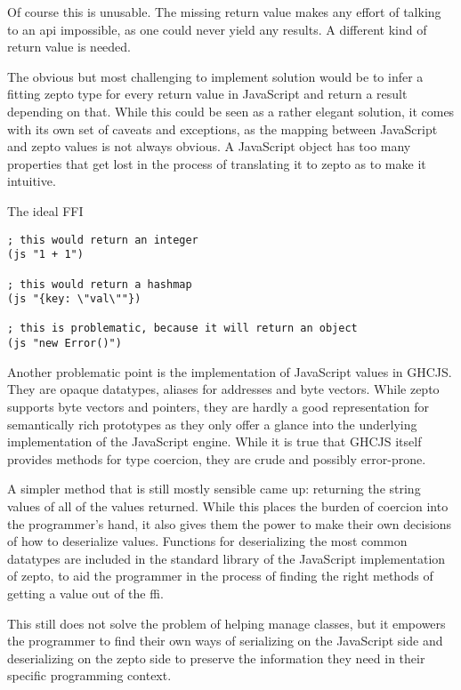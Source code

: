 \documentclass[oneside,11pt,xetex]{scrbook}
\begin{document}
Of course this is unusable. The missing return value makes any effort of talking to an
\gls{api} impossible, as one could never yield any results. A different kind of return
value is needed.

The obvious but most challenging to implement solution would be to infer a fitting zepto
type for every return value in JavaScript and return a result depending on that. While
this could be seen as a rather elegant solution, it comes with its own set of caveats
and exceptions, as the mapping between JavaScript and zepto values is not always obvious.
A JavaScript object has too many properties that get lost in the process of translating
it to zepto as to make it intuitive.

\begin{listing}[H]
\caption{The ideal FFI}
\begin{verbatim}
; this would return an integer
(js "1 + 1")

; this would return a hashmap
(js "{key: \"val\""})

; this is problematic, because it will return an object
(js "new Error()")
\end{verbatim}
\end{listing}

Another problematic point is the implementation of JavaScript values in GHCJS. They
are opaque datatypes, aliases for addresses and byte vectors. While zepto supports
byte vectors and pointers, they are hardly a good representation for semantically rich
prototypes as they only offer a glance into the underlying implementation of the
JavaScript engine. While it is true that GHCJS itself provides methods for type
coercion, they are crude and possibly error-prone.

A simpler method that is still mostly sensible came up: returning the string
values of all of the values returned. While this places the burden of coercion
into the programmer's hand, it also gives them the power to make their own 
decisions of how to deserialize values. Functions for deserializing the most
common datatypes are included in the standard library of the JavaScript
implementation of zepto, to aid the programmer in the process of finding
the right methods of getting a value out of the \gls{ffi}.

This still does not solve the problem of helping manage classes, but it empowers
the programmer to find their own ways of serializing on the JavaScript side
and deserializing on the zepto side to preserve the information they need in
their specific programming context.
\end{document}
